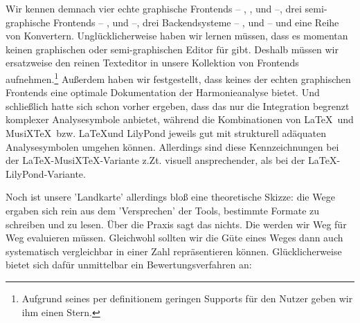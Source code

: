 Wir kennen demnach vier echte graphische Frontends -- ,
,  und  --, drei semi-graphische
Frontends -- ,  und  --,  drei
Backendsysteme -- ,  und
 -- und eine Reihe von Konvertern. Unglücklicherweise
haben wir lernen müssen, dass es momentan keinen graphischen oder
semi-graphischen Editor für  gibt. Deshalb müssen wir ersatzweise
den reinen Texteditor in unsere Kollektion von Frontends
aufnehmen.\footnote{Aufgrund seines per definitionem geringen Supports für den
Nutzer geben wir ihm einen Stern.} Außerdem haben wir festgestellt, dass keines
der echten graphischen Frontends eine optimale Dokumentation der Harmonieanalyse
bietet. Und schließlich hatte sich schon vorher ergeben, dass das
 nur die Integration begrenzt komplexer Analysesymbole
anbietet, während die Kombinationen von \LaTeX\ und MusiX\TeX\ bzw. \LaTeX und
LilyPond jeweils gut mit strukturell adäquaten Analysesymbolen umgehen können.
Allerdings sind diese Kennzeichnungen bei der \LaTeX-MusiX\TeX-Variante z.Zt.
visuell ansprechender, als bei der \LaTeX-LilyPond-Variante.

Noch ist unsere 'Landkarte' allerdings bloß eine theoretische Skizze: die Wege
ergaben sich rein aus dem 'Versprechen' der Tools, bestimmte Formate zu
schreiben und zu lesen. Über die Praxis sagt das nichts. Die werden wir Weg für
Weg evaluieren müssen. Gleichwohl sollten wir die Güte eines Weges dann auch
systematisch vergleichbar in einer Zahl repräsentieren können. Glücklicherweise
bietet sich dafür unmittelbar ein Bewertungsverfahren an:

